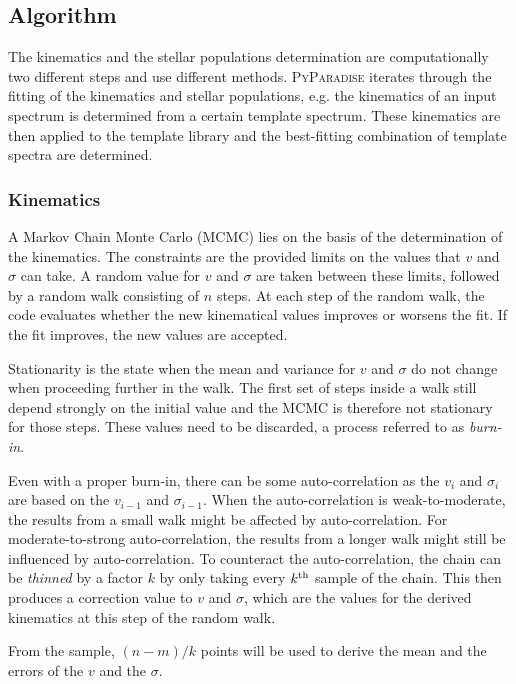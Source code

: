 \documentclass[usenatbib,usegraphicx,useAMS,onecolumn]{mn2e}
\begin{document}
\subsection{Algorithm}
\label{subsec:ssp_algo}
The kinematics and the stellar populations determination are computationally two different steps and use different methods.
\textsc{PyParadise} iterates through the fitting of the kinematics and stellar populations, e.g. the kinematics of an input spectrum is determined from a certain template spectrum.
These kinematics are then applied to the template library and the best-fitting combination of template spectra are determined.

\subsubsection{Kinematics}
\label{subsec:ssp_kin}
A Markov Chain Monte Carlo (MCMC) lies on the basis of the determination of the kinematics.
The constraints are the provided limits on the values that $v$ and $\sigma$ can take.
A random value for $v$ and $\sigma$ are taken between these limits, followed by a random walk consisting of $n$ steps.
At each step of the random walk, the code evaluates whether the new kinematical values improves or worsens the fit.
If the fit improves, the new values are accepted.

Stationarity is the state when the mean and variance for $v$ and $\sigma$ do not change when proceeding further in the walk.
The first set of steps inside a walk still depend strongly on the initial value and the MCMC is therefore not stationary for those steps.
These values need to be discarded, a process referred to as \textit{burn-in}.

Even with a proper burn-in, there can be some auto-correlation as the $v_i$ and $\sigma_i$ are based on the $v_{i-1}$ and $\sigma_{i-1}$.
When the auto-correlation is weak-to-moderate, the results from a small walk might be affected by auto-correlation.
For moderate-to-strong auto-correlation, the results from a longer walk might still be influenced by auto-correlation.
To counteract the auto-correlation, the chain can be \textit{thinned} by a factor $k$ by only taking every $k^{\rm th}$ sample of the chain.
This then produces a correction value to $v$ and $\sigma$, which are the values for the derived kinematics at this step of the random walk.

From the sample, $(n - m) / k$ points will be used to derive the mean and the errors of the $v$ and the $\sigma$.
\end{document}

